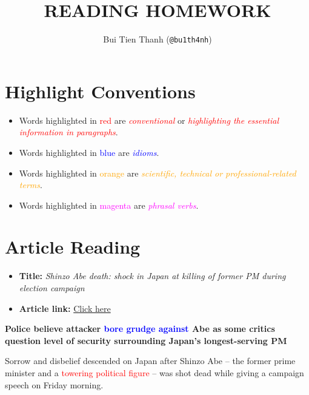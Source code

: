 \documentclass[12pt,a4paper]{article}
\title{\fontfamily{iwona}\selectfont \MakeUppercase{\textbf{Reading Homework}}}
\author{\fontfamily{iwona}\selectfont Bui Tien Thanh (\texttt{@bu1th4nh})}
\begin{document}
    \maketitle 

    \section{Highlight Conventions}
    \begin{itemize}
        \item Words highlighted in \textcolor{red}{red} are \textcolor{red}{\textit{conventional}} or \textcolor{red}{\textit{highlighting the essential information in paragraphs}}.
        \item Words highlighted in \textcolor{blue}{blue} are \textcolor{blue}{\textit{idioms}}. 
        \item Words highlighted in \textcolor{orange}{orange} are \textcolor{orange}{\textit{scientific, technical or professional-related terms}}. 
        \item Words highlighted in \textcolor{magenta}{magenta} are \textcolor{magenta}{\textit{phrasal verbs}}. 
    \end{itemize}

    \section{Article Reading}

    \begin{itemize}
        \item \textbf{Title:} \textit{Shinzo Abe death: shock in Japan at killing of former PM during election campaign}
        \item \textbf{Article link:} \href{https://www.theguardian.com/world/2022/jul/08/shinzo-abe-japans-former-prime-minister-dies-after-being-shot}{Click here}
    \end{itemize}

    \par \textbf{Police believe attacker \textcolor{blue}{bore grudge against} \cite{bore_grudge_against} Abe as some critics question level of security surrounding Japan’s longest-serving PM}

    \par Sorrow and disbelief descended on Japan after Shinzo Abe – the former prime minister and a \textcolor{red}{towering political figure}\cite{towering} – was shot dead while giving a campaign speech on Friday morning.
\end{document}

